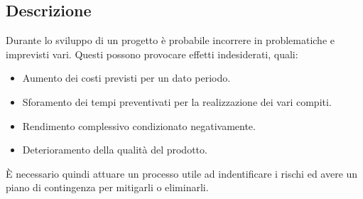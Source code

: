 \subsection{Descrizione}
    Durante lo sviluppo di un progetto è probabile incorrere in problematiche e imprevisti vari. Questi possono provocare effetti indesiderati, quali:
    \begin{itemize}
        \item Aumento dei costi previsti per un dato periodo.
        \item Sforamento dei tempi preventivati per la realizzazione dei vari compiti.
        \item Rendimento complessivo condizionato negativamente.
        \item Deterioramento della qualità del prodotto.
    \end{itemize}

    È necessario quindi attuare un processo utile ad indentificare i rischi ed avere un piano di contingenza per mitigarli o eliminarli.